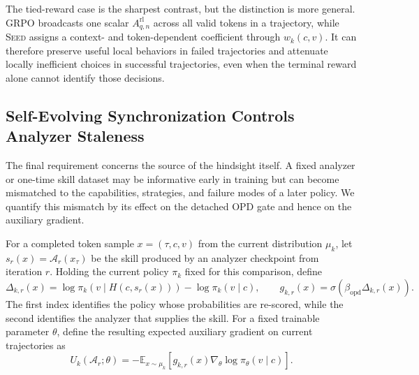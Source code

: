 The tied-reward case is the sharpest contrast, but the distinction is more general. GRPO broadcasts one scalar
$A^{\mathrm{rl}}_{q,n}$
across all valid tokens in a trajectory, while \textsc{Seed} assigns a context- and token-dependent coefficient through $w_k(c,v)$. It can therefore preserve useful local behaviors in failed trajectories and attenuate locally inefficient choices in successful trajectories, even when the terminal reward alone cannot identify those decisions.

\subsection{Self-Evolving Synchronization Controls Analyzer Staleness}
\label{app:theory_selfevolving}
The final requirement concerns the source of the hindsight itself. A fixed analyzer or one-time skill dataset may be informative early in training but can become mismatched to the capabilities, strategies, and failure modes of a later policy. We quantify this mismatch by its effect on the detached OPD gate and hence on the auxiliary gradient.

For a completed token sample $x=(\tau,c,v)$ from the current distribution $\mu_k$, let
$s_r(x)=\mathcal A_r(x_\tau)$
be the skill produced by an analyzer checkpoint from iteration $r$. Holding the current policy $\pi_k$ fixed for this comparison, define
\begin{equation}
 \Delta_{k,r}(x)
 =
 \log\pi_k(v\mid H(c,s_r(x)))
 -
 \log\pi_k(v\mid c),
 \qquad
 g_{k,r}(x)
 =
 \sigma\!\left(
 \beta_{\mathrm{opd}}\Delta_{k,r}(x)
 \right).
 \label{eq:analyzer_shift_gate}
\end{equation}
The first index identifies the policy whose probabilities are re-scored, while the second identifies the analyzer that supplies the skill. For a fixed trainable parameter $\theta$, define the resulting expected auxiliary gradient on current trajectories as
\begin{equation}
 U_k(\mathcal A_r;\theta)
 =
 -\mathbb E_{x\sim\mu_k}
 \left[
 g_{k,r}(x)
 \nabla_\theta\log\pi_\theta(v\mid c)
 \right].
 \label{eq:analyzer_gradient_definition}
\end{equation}

